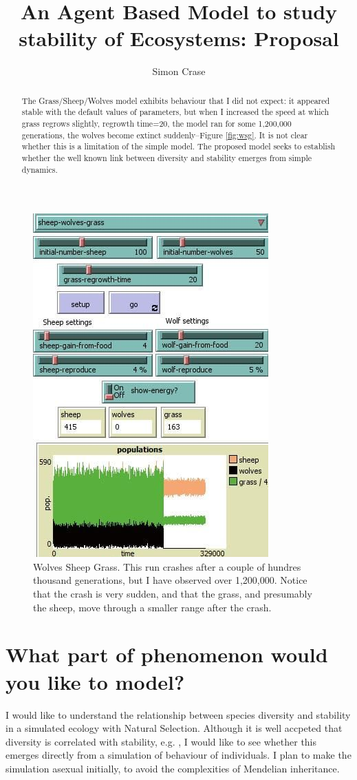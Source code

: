 \documentclass[]{article}
\title{An Agent Based Model to study stability of Ecosystems: Proposal}
\author{Simon Crase}
\begin{document}
\maketitle

\begin{abstract}
The Grass/Sheep/Wolves model \cite{Wilensky:1997,wilensky2006thinking} exhibits behaviour that I did not expect: it appeared stable with the default values of parameters, but when I increased the speed at which grass regrows slightly, regrowth time=20, the model ran for some 1,200,000 generations, the wolves become extinct suddenly--Figure \ref{fig:wsg}. It is not clear whether this is a limitation of the simple model.  The proposed model seeks to establish whether the well known link between diversity and stability emerges from simple dynamics.
\end{abstract}

\begin{figure}[b]
	\centering
	\includegraphics[width=0.5\linewidth]{wsg20.jpg}
	\caption{Wolves Sheep Grass. This run crashes after a couple of hundres thousand generations, but I have observed over 1,200,000. Notice that the crash is very sudden, and that the grass, and presumably the sheep, move through a smaller range after the crash.}
	\label{fig:wsg}
\end{figure}

\section{What part of phenomenon would you like to model?}

I would like to understand the relationship between species diversity and stability in a simulated ecology with Natural Selection. Although it is well accpeted that diversity is correlated with stability, e.g. \cite{cleland:2011}, I would like to see whether this emerges directly from a simulation of behaviour of individuals. I plan to make the simulation asexual initially, to avoid the complexities of Mendelian inheritance.
\end{document}
